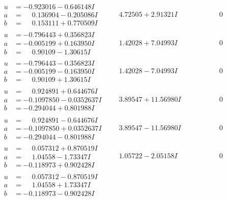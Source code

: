 \documentclass[1p]{elsarticle_modified}
\theoremstyle{definition}
\begin{document}
$$\begin{array}{c|c|c}
\begin{aligned}
u &= -0.923016 - 0.646148 I \\
a &= \phantom{-}0.136904 - 0.205086 I \\
b &= \phantom{-}0.153111 + 0.770509 I\end{aligned}
 & \phantom{-}4.72505 + 2.91321 I & \phantom{-0.000000 } 0 \\ \hline\begin{aligned}
u &= -0.796443 + 0.356823 I \\
a &= -0.005199 + 0.163950 I \\
b &= \phantom{-}0.90109 - 1.30615 I\end{aligned}
 & \phantom{-}1.42028 + 7.04993 I & \phantom{-0.000000 } 0 \\ \hline\begin{aligned}
u &= -0.796443 - 0.356823 I \\
a &= -0.005199 - 0.163950 I \\
b &= \phantom{-}0.90109 + 1.30615 I\end{aligned}
 & \phantom{-}1.42028 - 7.04993 I & \phantom{-0.000000 } 0 \\ \hline\begin{aligned}
u &= \phantom{-}0.924891 + 0.644676 I \\
a &= -0.1097850 - 0.0352637 I \\
b &= -0.294044 + 0.801988 I\end{aligned}
 & \phantom{-}3.89547 + 11.56980 I & \phantom{-0.000000 } 0 \\ \hline\begin{aligned}
u &= \phantom{-}0.924891 - 0.644676 I \\
a &= -0.1097850 + 0.0352637 I \\
b &= -0.294044 - 0.801988 I\end{aligned}
 & \phantom{-}3.89547 - 11.56980 I & \phantom{-0.000000 } 0 \\ \hline\begin{aligned}
u &= \phantom{-}0.057312 + 0.870519 I \\
a &= \phantom{-}1.04558 - 1.73347 I \\
b &= -0.118973 + 0.902428 I\end{aligned}
 & \phantom{-}1.05722 - 2.05158 I & \phantom{-0.000000 } 0 \\ \hline\begin{aligned}
u &= \phantom{-}0.057312 - 0.870519 I \\
a &= \phantom{-}1.04558 + 1.73347 I \\
b &= -0.118973 - 0.902428 I\end{aligned}

\end{array}$$
\end{document}
